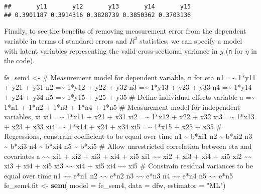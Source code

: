\documentclass[]{interact}
\theoremstyle{plain}%
\theoremstyle{definition}
\theoremstyle{remark}
\newenvironment{Shaded}{\begin{snugshade}}{\end{snugshade}}
\newcommand{\DataTypeTok}[1]{\textcolor[rgb]{0.13,0.29,0.53}{#1}}
\newcommand{\KeywordTok}[1]{\textcolor[rgb]{0.13,0.29,0.53}{\textbf{#1}}}
\newcommand{\NormalTok}[1]{#1}
\newcommand{\StringTok}[1]{\textcolor[rgb]{0.31,0.60,0.02}{#1}}
\begin{document}
\begin{verbatim}
##       y11       y12       y13       y14       y15 
## 0.3901187 0.3914316 0.3828739 0.3850362 0.3703136
\end{verbatim}

\doublespacing

Finally, to see the benefits of removing measurement error from the
dependent variable in terms of standard errors and \(R^{2}\) statistics,
we can specify a model with latent variables representing the valid
cross-sectional variance in \(y\) (\texttt{n} for \(\eta\) in the code).

\singlespacing

\begin{Shaded}
\begin{Highlighting}[]
\NormalTok{fe\_sem4 \textless{}{-}}\StringTok{ \textquotesingle{}}
\StringTok{\# Measurement model for dependent variable, n for eta}
\StringTok{n1 =\textasciitilde{} 1*y11 + y21 + y31}
\StringTok{n2 =\textasciitilde{} 1*y12 + y22 + y32}
\StringTok{n3 =\textasciitilde{} 1*y13 + y23 + y33}
\StringTok{n4 =\textasciitilde{} 1*y14 + y24 + y34}
\StringTok{n5 =\textasciitilde{} 1*y15 + y25 + y35}
\StringTok{\# Define individual effects variable }
\StringTok{a =\textasciitilde{} 1*n1 + 1*n2 + 1*n3 + 1*n4 + 1*n5}
\StringTok{\# Measurement model for independent variables, xi }
\StringTok{xi1 =\textasciitilde{} 1*x11 + x21 + x31 }
\StringTok{xi2 =\textasciitilde{} 1*x12 + x22 + x32}
\StringTok{xi3 =\textasciitilde{} 1*x13 + x23 + x33}
\StringTok{xi4 =\textasciitilde{} 1*x14 + x24 + x34}
\StringTok{xi5 =\textasciitilde{} 1*x15 + x25 + x35}
\StringTok{\# Regressions, constrain coefficient to be equal over time}
\StringTok{n1 \textasciitilde{} b*xi1}
\StringTok{n2 \textasciitilde{} b*xi2 }
\StringTok{n3 \textasciitilde{} b*xi3}
\StringTok{n4 \textasciitilde{} b*xi4}
\StringTok{n5 \textasciitilde{} b*xi5}
\StringTok{\# Allow unrestricted correlation between eta and covariates}
\StringTok{a \textasciitilde{}\textasciitilde{} xi1 + xi2 + xi3 + xi4 + xi5}
\StringTok{xi1 \textasciitilde{}\textasciitilde{} xi2 + xi3 + xi4 + xi5}
\StringTok{xi2 \textasciitilde{}\textasciitilde{} xi3 + xi4 + xi5}
\StringTok{xi3 \textasciitilde{}\textasciitilde{} xi4 + xi5}
\StringTok{xi4 \textasciitilde{}\textasciitilde{} xi5}
\StringTok{\# Constrain residual variances to be equal over time}
\StringTok{n1 \textasciitilde{}\textasciitilde{} e*n1}
\StringTok{n2 \textasciitilde{}\textasciitilde{} e*n2}
\StringTok{n3 \textasciitilde{}\textasciitilde{} e*n3}
\StringTok{n4 \textasciitilde{}\textasciitilde{} e*n4}
\StringTok{n5 \textasciitilde{}\textasciitilde{} e*n5}
\StringTok{\textquotesingle{}}
\NormalTok{fe\_sem4.fit \textless{}{-}}\StringTok{ }\KeywordTok{sem}\NormalTok{( }\DataTypeTok{model =}\NormalTok{ fe\_sem4, }
                    \DataTypeTok{data =}\NormalTok{ dfw, }
                    \DataTypeTok{estimator =} \StringTok{"ML"}\NormalTok{)}
\end{Highlighting}
\end{Shaded}
\end{document}
